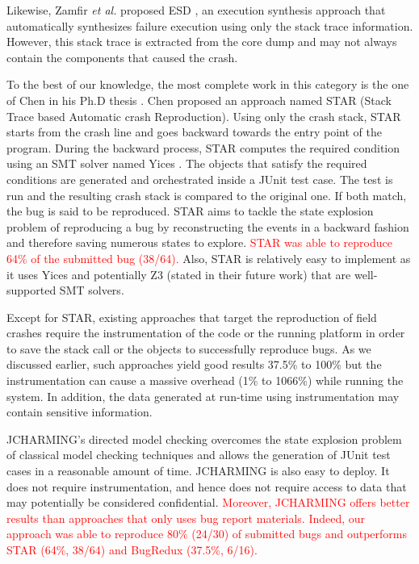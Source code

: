 \documentclass[times, doublespace]{smrauth}
\newcommand{\red}[1]{\textcolor{red}{#1}}
\begin{document}
Likewise, Zamfir {\it et al.} proposed ESD \cite{Zamfir2010}, an execution synthesis approach that automatically synthesizes failure execution using only the stack trace information. However, this stack trace is extracted from the core dump and may not always contain the components that caused the crash.

To the best of our knowledge, the most complete work in this category is the one of Chen in his Ph.D thesis \cite{Chen2013a}. Chen proposed an approach named STAR (Stack Trace based Automatic crash Reproduction). Using only the crash stack, STAR starts from the crash line and goes backward towards the entry point of the program. During the backward process, STAR computes the required condition using an SMT solver named Yices \cite{Dutertre2006}. The objects that satisfy the required conditions are generated and orchestrated inside a JUnit test case. The test is run and the resulting crash stack is compared to the original one. If both match, the bug is said to be reproduced. STAR aims to tackle the state explosion problem of reproducing a bug by reconstructing the events in a backward fashion and therefore saving numerous states to explore. \red{STAR was able to reproduce 64\% of the submitted bug (38/64).}
Also, STAR is relatively easy to implement as it uses Yices \cite{Dutertre2006} and potentially Z3 \cite{de2008z3} (stated in their future work) that are well-supported SMT solvers.

Except for STAR, existing approaches that target the reproduction of
field crashes require the instrumentation of the code or the running
platform in order to save the stack call or the objects to successfully
reproduce bugs. As we discussed earlier, such approaches yield good results 37.5\% to 100\% but the instrumentation can cause a massive
overhead (1\% to 1066\%) while running the system.
In addition, the data generated at run-time using instrumentation
may contain sensitive information.

JCHARMING's directed model checking overcomes the state explosion problem of
classical model checking techniques and allows the generation of
JUnit test cases in a reasonable amount of time.
JCHARMING is also easy to deploy. It does not require instrumentation,
and hence does not require access to data that may potentially
be considered confidential.
\red{Moreover, JCHARMING offers better results than approaches that only uses bug report materials.
Indeed, our approach was able to reproduce 80\% (24/30) of submitted bugs and outperforms STAR (64\%, 38/64) and BugRedux (37.5\%, 6/16).}
\end{document}
